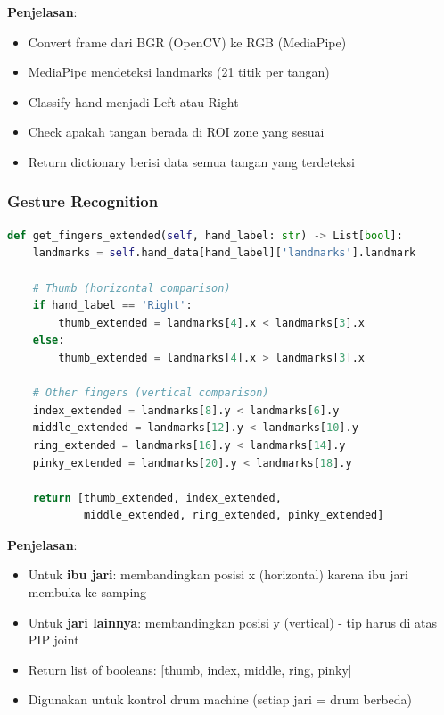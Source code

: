 \textbf{Penjelasan}:
\begin{itemize}
    \item Convert frame dari BGR (OpenCV) ke RGB (MediaPipe)
    \item MediaPipe mendeteksi landmarks (21 titik per tangan)
    \item Classify hand menjadi Left atau Right
    \item Check apakah tangan berada di ROI zone yang sesuai
    \item Return dictionary berisi data semua tangan yang terdeteksi
\end{itemize}



\subsubsection{Gesture Recognition}

\begin{lstlisting}[language=Python, caption=Deteksi jari yang terangkat]
def get_fingers_extended(self, hand_label: str) -> List[bool]:
    landmarks = self.hand_data[hand_label]['landmarks'].landmark
    
    # Thumb (horizontal comparison)
    if hand_label == 'Right':
        thumb_extended = landmarks[4].x < landmarks[3].x
    else:
        thumb_extended = landmarks[4].x > landmarks[3].x
    
    # Other fingers (vertical comparison)
    index_extended = landmarks[8].y < landmarks[6].y
    middle_extended = landmarks[12].y < landmarks[10].y
    ring_extended = landmarks[16].y < landmarks[14].y
    pinky_extended = landmarks[20].y < landmarks[18].y
    
    return [thumb_extended, index_extended, 
            middle_extended, ring_extended, pinky_extended]
\end{lstlisting}

\textbf{Penjelasan}:
\begin{itemize}
    \item Untuk \textbf{ibu jari}: membandingkan posisi x (horizontal) karena ibu jari membuka ke samping
    \item Untuk \textbf{jari lainnya}: membandingkan posisi y (vertical) - tip harus di atas PIP joint
    \item Return list of booleans: [thumb, index, middle, ring, pinky]
    \item Digunakan untuk kontrol drum machine (setiap jari = drum berbeda)
\end{itemize}

